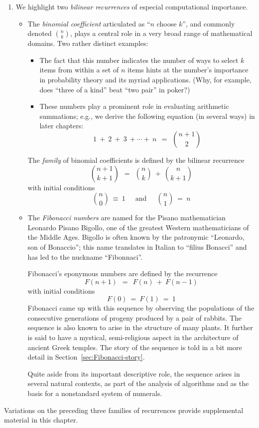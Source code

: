 \begin{enumerate}
\item
We highlight two {\it bilinear recurrences} of especial computational
importance.
  \begin{itemize}
  \item
The {\it binomial coefficient} articulated as ``$n$ choose $k$'', and
commonly denoted $\displaystyle {n \choose k}$, plays a central role
in a very broad range of mathematical domains.  Two rather distinct
examples:
       \begin{itemize}
       \item
The fact that this number indicates the number of ways to select $k$
items from within a set of $n$ items hints at the number's importance
in probability theory and its myriad applications.  (Why, for example,
does ``three of a kind'' beat ``two pair'' in poker?)
       \item
These numbers play a prominent role in evaluating arithmetic
summations; e.g., we derive the following equation (in several ways)
in later chapters:
\[ 1 \ + \ 2 \ + \ 3 \ + \cdots + \ n \ \ = \ \ {{n+1} \choose 2} \]
       \end{itemize}
The {\em family} of binomial coefficients is defined by the bilinear
recurrence
\[ {{n+1} \choose {k+1}} \ \ = \ \ {n \choose k} \ + \ {n \choose {k+1}} \]
with initial conditions
\[ {n \choose 0} \ \equiv \ 1 \ \ \ \ \ \mbox{ and } \ \ \ \ \
{n \choose 1} \ = \ n
\]

  \item
The {\it Fibonacci numbers} are named for the Pisano mathematician
Leonardo Pisano Bigollo, one of the greatest Western mathematicians of
the Middle Ages.  Bigollo is often known by the patronymic ``Leonardo,
son of Bonaccio''; this name translates in Italian to ``filius
Bonacci'' and has led to the nuckname ``Fibonnaci''.

Fibonacci's eponymous numbers are defined by the recurrence
\[ F(n+1) \ \ = \ \ F(n) \ + \ F(n-1) \]
with initial conditions
\[ F(0) \ = \ F(1) \ = \ 1 \]
Fibonacci came up with this sequence by observing the populations of
the consecutive generations of progeny produced by a pair of rabbits.
The sequence is also known to arise in the structure of many plants.
It further is said to have a mystical, semi-religious aspect in the
architecture of ancient Greek temples.  The story of the sequence is
told in a bit more detail in Section~\ref{sec:Fibonacci-story}.

Quite aside from its important descriptive role, the sequence arises
in several natural contexts, as part of the analysis of algorithms and
as the basis for a nonstandard system of numerals.
  \end{itemize}
\end{enumerate}
Variations on the preceding three families of recurrences provide
supplemental material in this chapter.

